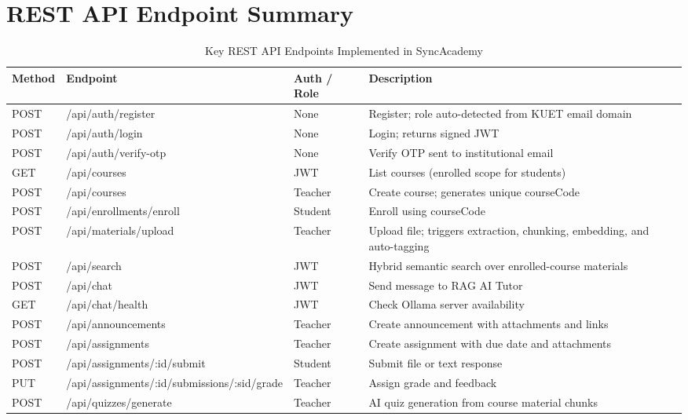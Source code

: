 \documentclass[12pt,a4paper]{report}
\begin{document}
\appendix

\chapter{REST API Endpoint Summary}

\begin{table}[htbp]
\caption{Key REST API Endpoints Implemented in SyncAcademy}
\label{tab:api}
\centering
\small
\begin{tabularx}{\textwidth}{|l|l|l|X|}
\hline
\textbf{Method} & \textbf{Endpoint} & \textbf{Auth / Role} & \textbf{Description} \\
\hline
POST & /api/auth/register & None & Register; role auto-detected from KUET email domain \\
POST & /api/auth/login & None & Login; returns signed JWT \\
POST & /api/auth/verify-otp & None & Verify OTP sent to institutional email \\
GET  & /api/courses & JWT & List courses (enrolled scope for students) \\
POST & /api/courses & Teacher & Create course; generates unique courseCode \\
POST & /api/enrollments/enroll & Student & Enroll using courseCode \\
POST & /api/materials/upload & Teacher & Upload file; triggers extraction, chunking, embedding, and auto-tagging \\
POST & /api/search & JWT & Hybrid semantic search over enrolled-course materials \\
POST & /api/chat & JWT & Send message to RAG AI Tutor \\
GET  & /api/chat/health & JWT & Check Ollama server availability \\
POST & /api/announcements & Teacher & Create announcement with attachments and links \\
POST & /api/assignments & Teacher & Create assignment with due date and attachments \\
POST & /api/assignments/:id/submit & Student & Submit file or text response \\
PUT  & /api/assignments/:id/submissions/:sid/grade & Teacher & Assign grade and feedback \\
POST & /api/quizzes/generate & Teacher & AI quiz generation from course material chunks \\



\hline
\end{tabularx}
\end{table}
\end{document}
